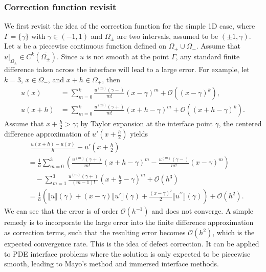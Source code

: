 \documentclass[preprint,11pt]{elsarticle}
\theoremstyle{remark}
\newcommand{\paren}[1]{\left(#1\right)}
\newcommand{\jump}[1]{\llbracket#1\rrbracket}
\newcommand{\at}[2]{\left. #1 \right|_{#2}}
\newcommand{\mc}[1]{\mathcal{#1}}
\begin{document}
\subsubsection{Correction function revisit}
We first revisit the idea of the correction function for the simple 1D case, where $\Gamma = \{\gamma\}$ with $\gamma \in (-1,1)$ and $\Omega_\pm$ are two intervals, assumed to be $(\pm 1, \gamma)$.
Let $u$ be a piecewise continuous function defined on $\Omega_+\cup\Omega_-$.
Assume that $\at{u}{\Omega_\pm}\in C^{k}(\overline{\Omega_\pm})$. Since $u$ is not smooth at the point $\Gamma$, any standard finite difference taken across the interface will lead to a large error. 
For example, let $k=3$, $x\in\Omega_-$, and $x+h\in\Omega_+$, then
\begin{equation}
\begin{aligned}
    u(x) &= \sum_{m = 0}^k \frac{u^{(m)}(\gamma-)}{m!} (x - \gamma)^m + \mc{O}((x-\gamma)^{k}), \\ 
    u(x+h) &= \sum_{m = 0}^k \frac{u^{(m)}(\gamma+)}{m!} (x +h - \gamma)^m + \mc{O}((x+h-\gamma)^{k}).
\end{aligned}
\end{equation}
Assume that $x+\frac{h}{2} > \gamma$; by Taylor expansion at the interface point $\gamma$, the centered difference approximation of $u'\paren{x+\frac{h}{2}}$ yields
\begin{equation}\label{eqn:fd-1}
\begin{aligned}
    &\,\,\frac{u(x+h) - u(x)}{h} - u'\paren{x+\frac{h}{2}} \\
    &= \frac{1}{h} \sum_{m = 0}^3 \paren{ \frac{u^{(m)}(\gamma+)}{m!} (x + h - \gamma)^m -  
    \frac{u^{(m)}(\gamma-)}{m!} (x - \gamma)^m } \\
    &\quad - \sum_{m = 1}^3  \frac{u^{(m)}(\gamma+)}{(m-1)!} (x + \frac{h}{2} - \gamma)^m  + \mathcal{O}(h^{3}) \\
    & = \frac{1}{h}\paren{\jump{u}(\gamma) + (x-\gamma) \jump{u'}(\gamma) + \frac{(x-\gamma)^2}{2}\jump{u^{\prime\prime}}(\gamma)} + \mathcal{O}(h^2).
\end{aligned}
\end{equation}
We can see that the error is of order $\mathcal{O}(h^{-1})$ and does not converge.
A simple remedy is to incorporate the large error into the finite difference approximation as correction terms, such that the resulting error becomes $\mathcal{O}(h^2)$, which is the expected convergence rate. This is the idea of defect correction. It can be applied to PDE interface problems where the solution is only expected to be piecewise smooth, leading to Mayo's method and immersed interface methods.
\end{document}
